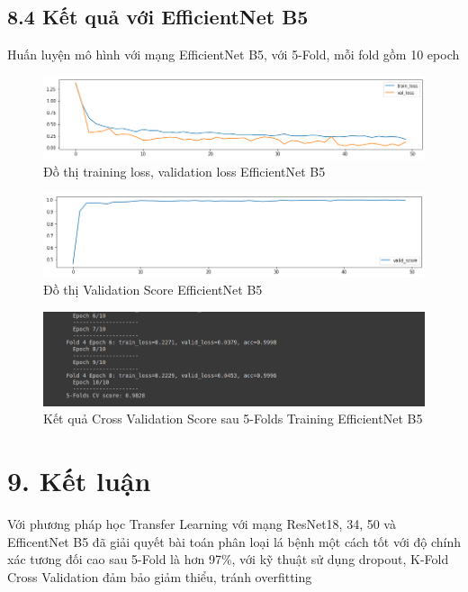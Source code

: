 \documentclass{article}
\begin{document}
	\subsection{8.4 Kết quả với EfficientNet B5}
	Huấn luyện mô hình với mạng EfficientNet B5, với 5-Fold, mỗi fold gồm 10 epoch
	\begin{figure}[H]
		\centering
		\includegraphics[width=1\linewidth]{results/efficientnet-b5/training_loss_results_50.png}
		\caption{Đồ thị training loss, validation loss EfficientNet B5}
		\label{fig:writing-thesis}
	\end{figure}
	\begin{figure}[H]
		\centering
		\includegraphics[width=1\linewidth]{results/efficientnet-b5/valid_score_results_50.png}
		\caption{Đồ thị Validation Score EfficientNet B5}
		\label{fig:writing-thesis}
	\end{figure}
	\begin{figure}[H]
		\centering
		\includegraphics[width=1\linewidth]{results/efficientnet-b5/CV_Score_5_Folds_EfficientNetB5_50.png}
		\caption{Kết quả Cross Validation Score sau 5-Folds Training EfficientNet B5}
		\label{fig:writing-thesis}
	\end{figure}
	\section{9. Kết luận}
	Với phương pháp học Transfer Learning với mạng ResNet18, 34, 50 và EfficentNet B5 đã giải quyết bài toán phân loại lá bệnh một cách tốt với độ chính xác tương đối cao sau 5-Fold là hơn 97\%, với kỹ thuật sử dụng dropout, K-Fold Cross Validation đảm bảo giảm thiểu, tránh overfitting
	
\end{document}
